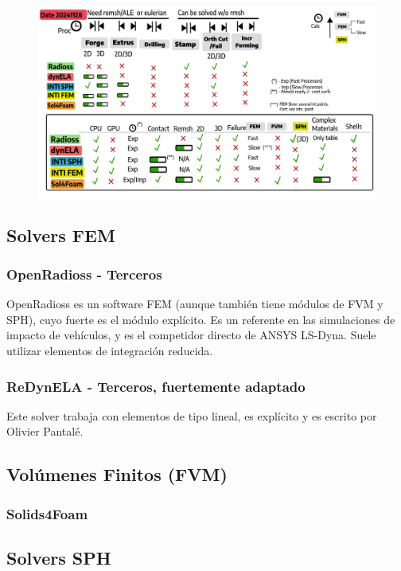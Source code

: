 \documentclass{article}
\begin{document}
\begin{figure}
\includegraphics[width=1.0\textwidth]{images/20241126_Tools.png}
\end{figure}

\subsection{Solvers FEM}

\subsubsection{OpenRadioss - Terceros}
OpenRadioss es un software FEM (aunque también tiene módulos de FVM y SPH), cuyo fuerte es el módulo explícito. Es un referente en las simulaciones de impacto de vehículos, y es el competidor directo de ANSYS LS-Dyna. Suele utilizar elementos de integración reducida. 

\subsubsection{ReDynELA - Terceros, fuertemente adaptado}
Este solver trabaja con elementos de tipo lineal, es explícito y es escrito por Olivier Pantalé. 

\subsection{Volúmenes Finitos (FVM)}
\subsubsection{Solids4Foam}


\subsection{Solvers SPH}
\end{document}
